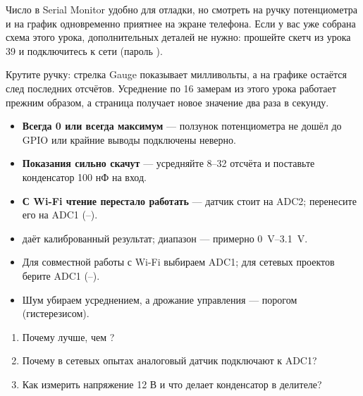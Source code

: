 Число в Serial Monitor удобно для отладки, но смотреть на ручку потенциометра и на график
одновременно приятнее на экране телефона. Если у вас уже собрана схема этого урока, дополнительных
деталей не нужно: прошейте скетч из урока 39 и подключитесь к сети 
(пароль ).


Крутите ручку: стрелка Gauge показывает милливольты, а на графике остаётся след последних
отсчётов. Усреднение по 16 замерам из этого урока работает прежним образом, а страница
получает новое значение два раза в секунду.

\begin{trouble}
\begin{itemize}[leftmargin=*]
  \item \textbf{Всегда 0 или всегда максимум} --- ползунок потенциометра не дошёл до GPIO или крайние выводы подключены неверно.
  \item \textbf{Показания сильно скачут} --- усредняйте 8--32 отсчёта и поставьте конденсатор 100 нФ на вход.
  \item \textbf{С Wi-Fi чтение перестало работать} --- датчик стоит на ADC2; перенесите его на ADC1 (--).
\end{itemize}
\end{trouble}

\begin{summary}
\begin{itemize}[leftmargin=*]
  \item {} даёт калиброванный результат; диапазон --- примерно \SIrange{0}{3.1}{V}.
  \item Для совместной работы с Wi-Fi выбираем ADC1; для сетевых проектов берите ADC1 (--).
  \item Шум убираем усреднением, а дрожание управления --- порогом (гистерезисом).
\end{itemize}
\end{summary}

\begin{selfcheck}
\begin{enumerate}
  \item Почему  лучше, чем ?
  \item Почему в сетевых опытах аналоговый датчик подключают к ADC1?
  \item Как измерить напряжение 12 В и что делает конденсатор в делителе?
\end{enumerate}
\end{selfcheck}

